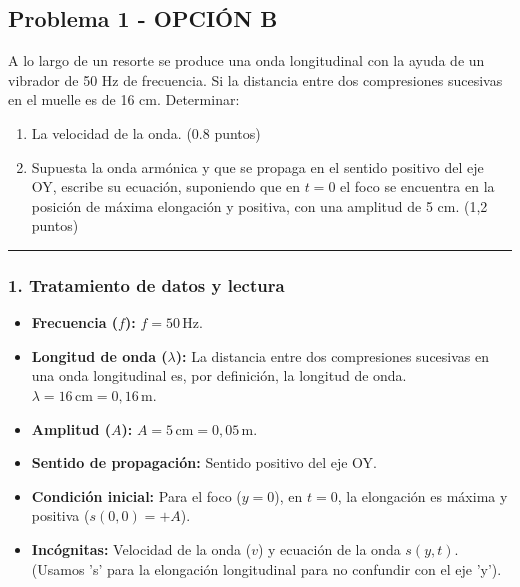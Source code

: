 \subsection{Problema 1 - OPCIÓN B}
\label{subsec:2B_2001_sep_ext}

\begin{cajaenunciado}
A lo largo de un resorte se produce una onda longitudinal con la ayuda de un vibrador de 50 Hz de frecuencia. Si la distancia entre dos compresiones sucesivas en el muelle es de 16 cm. Determinar:
\begin{enumerate}
    \item La velocidad de la onda. (0.8 puntos)
    \item Supuesta la onda armónica y que se propaga en el sentido positivo del eje OY, escribe su ecuación, suponiendo que en $t=0$ el foco se encuentra en la posición de máxima elongación y positiva, con una amplitud de 5 cm. (1,2 puntos)
\end{enumerate}
\end{cajaenunciado}
\hrule

\subsubsection*{1. Tratamiento de datos y lectura}
\begin{itemize}
    \item \textbf{Frecuencia ($f$):} $f = 50 \, \text{Hz}$.
    \item \textbf{Longitud de onda ($\lambda$):} La distancia entre dos compresiones sucesivas en una onda longitudinal es, por definición, la longitud de onda. $\lambda = 16 \, \text{cm} = 0,16 \, \text{m}$.
    \item \textbf{Amplitud ($A$):} $A = 5 \, \text{cm} = 0,05 \, \text{m}$.
    \item \textbf{Sentido de propagación:} Sentido positivo del eje OY.
    \item \textbf{Condición inicial:} Para el foco ($y=0$), en $t=0$, la elongación es máxima y positiva ($s(0,0) = +A$).
    \item \textbf{Incógnitas:} Velocidad de la onda ($v$) y ecuación de la onda $s(y,t)$. (Usamos 's' para la elongación longitudinal para no confundir con el eje 'y').
\end{itemize}

